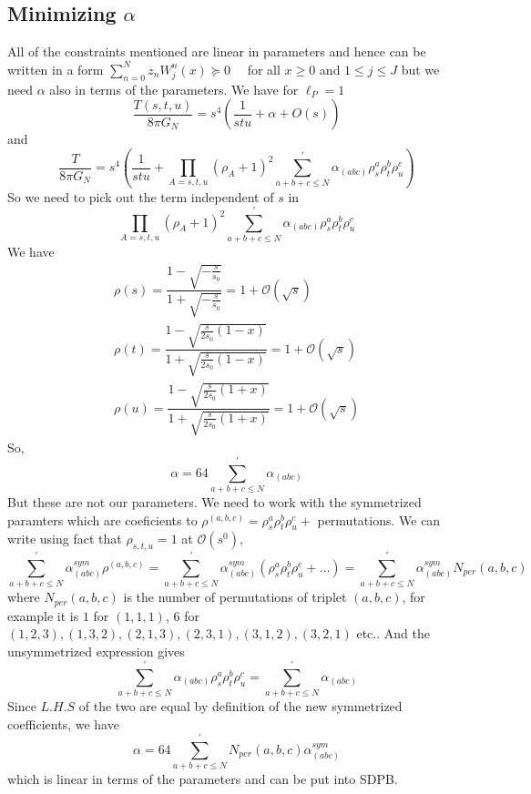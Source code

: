 ﻿\documentclass[12pt,a4paper]{article}
\begin{document}
\subsection{Minimizing $\alpha$}
All of the constraints mentioned are linear in parameters and hence can be written in a form $\sum_{n=0}^{N} z_{n} W_{j}^{n}(x) \succeq 0 \quad$ for all $x \geq 0$ and $1 \leq j \leq J$ but we need $\alpha$ also in terms of the parameters. We have for $\ell_{P}=1$
$$
\frac{T(s, t, u)}{8 \pi G_{N}}=s^{4}\left(\frac{1}{s t u}+\alpha +O(s)\right)
$$
and
$$
\frac{T}{8 \pi G_{N}}=s^{4}\left(\frac{1}{s t u}+\prod_{A=s, t, u}\left(\rho_{A}+1\right)^{2} \sum_{a+b+c \leq N}^{\prime} \alpha_{(a b c)} \rho_{s}^{a} \rho_{t}^{b} \rho_{u}^{c}\right)
$$
So we need to pick out the term independent of $s$ in 
$$
\prod_{A=s, t, u}\left(\rho_{A}+1\right)^{2} \sum_{a+b+c \leq N}^{\prime} \alpha_{(a b c)} \rho_{s}^{a} \rho_{t}^{b} \rho_{u}^{c}
$$
We have 
$$
\begin{array}{l}
\rho(s)=\dfrac{1-\sqrt{-\frac{s}{s_{0}}}}{1+\sqrt{-\frac{s}{s_{0}}}} =1+\mathcal{O}(\sqrt{s})\\
\rho(t)=\dfrac{1-\sqrt{\frac{s}{2s_{0}}(1-x)}}{1+\sqrt{\frac{s}{2s_{0}}(1-x)}} =1+\mathcal{O}(\sqrt{s})\\
\rho(u)=\dfrac{1-\sqrt{\frac{s}{2s_{0}}(1+x)}}{1+\sqrt{\frac{s}{2s_{0}}(1+x)}} =1+\mathcal{O}(\sqrt{s})
\end{array}
$$
So,
$$
\alpha=64 \sum_{a+b+c \leq N}^{\prime} \alpha_{(a b c)} 
$$
But these are not our parameters. We need to work with the symmetrized paramters which are coeficients to $\rho^{(a, b,c)}=\rho_{s}^{a} \rho_{t}^{b} \rho_{u}^{c}+$ permutations. We can write using fact that $\rho_{s,t,u}=1$ at $\mathcal{O}(s^{0})$,
$$
\sum_{a+b+c \leq N}^{\prime} \alpha^{sym}_{(a b c)} \rho^{(a, b,c)}=\sum_{a+b+c \leq N}^{\prime} \alpha^{sym}_{(a b c)} \left(\rho_{s}^{a} \rho_{t}^{b} \rho_{u}^{c}+\ldots \right)=\sum_{a+b+c \leq N}^{\prime} \alpha^{sym}_{(a b c)} N_{per}(a,b,c)
$$
where $ N_{per}(a,b,c)$ is the number of permutations of triplet $(a,b,c)$, for example it is $1$ for ${(1,1,1)}$, $6$ for ${(1,2,3), (1,3,2), (2,1,3), (2,3,1), (3,1,2), (3,2,1)}$ etc.. And the unsymmetrized expression gives
$$
\sum_{a+b+c \leq N}^{\prime} \alpha_{(a b c)} \rho_{s}^{a} \rho_{t}^{b} \rho_{u}^{c}=\sum_{a+b+c \leq N}^{\prime} \alpha_{(a b c)}
$$
Since $L.H.S$ of the two are equal by definition of the new symmetrized coefficients, we have
$$
\alpha=64 \sum_{a+b+c \leq N}^{\prime} N_{per}(a,b,c) \alpha^{sym}_{(a b c)} 
$$
which is linear in terms of the parameters and can be put into SDPB.\\\\
\end{document}
